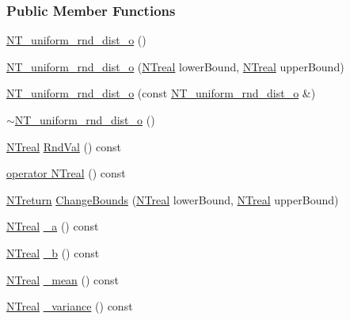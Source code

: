 \subsubsection*{Public Member Functions}
\begin{DoxyCompactItemize}
\item 
\hyperlink{class_n_t__uniform__rnd__dist__o_a8080222882e03991206cc0ab45b33ba9}{NT\_\-uniform\_\-rnd\_\-dist\_\-o} ()
\item 
\hyperlink{class_n_t__uniform__rnd__dist__o_ad5ca2e602baf3039e453cb636f148ee6}{NT\_\-uniform\_\-rnd\_\-dist\_\-o} (\hyperlink{nt__types_8h_a814a97893e9deb1eedcc7604529ba80d}{NTreal} lowerBound, \hyperlink{nt__types_8h_a814a97893e9deb1eedcc7604529ba80d}{NTreal} upperBound)
\item 
\hyperlink{class_n_t__uniform__rnd__dist__o_adeeb9c7fd267d75e3c13622bce35016d}{NT\_\-uniform\_\-rnd\_\-dist\_\-o} (const \hyperlink{class_n_t__uniform__rnd__dist__o}{NT\_\-uniform\_\-rnd\_\-dist\_\-o} \&)
\item 
\hyperlink{class_n_t__uniform__rnd__dist__o_a4e7396853d4a1ac8e03af02e2fbdef16}{$\sim$NT\_\-uniform\_\-rnd\_\-dist\_\-o} ()
\item 
\hyperlink{nt__types_8h_a814a97893e9deb1eedcc7604529ba80d}{NTreal} \hyperlink{class_n_t__uniform__rnd__dist__o_a37e4f70755b300a469a5af332ecd31ef}{RndVal} () const 
\item 
\hyperlink{class_n_t__uniform__rnd__dist__o_a08bf02422a5e48d01b002e4a753a6ccf}{operator NTreal} () const 
\item 
\hyperlink{nt__types_8h_ab9564ee8f091e809d21b8451c6683c53}{NTreturn} \hyperlink{class_n_t__uniform__rnd__dist__o_af12edfc771e062c2af641fa8c99d85bc}{ChangeBounds} (\hyperlink{nt__types_8h_a814a97893e9deb1eedcc7604529ba80d}{NTreal} lowerBound, \hyperlink{nt__types_8h_a814a97893e9deb1eedcc7604529ba80d}{NTreal} upperBound)
\item 
\hyperlink{nt__types_8h_a814a97893e9deb1eedcc7604529ba80d}{NTreal} \hyperlink{class_n_t__uniform__rnd__dist__o_a255e49ba55d593269a4ceefdd4a326cc}{\_\-a} () const 
\item 
\hyperlink{nt__types_8h_a814a97893e9deb1eedcc7604529ba80d}{NTreal} \hyperlink{class_n_t__uniform__rnd__dist__o_aa175c7a6c7578052ea926a9a9b8864b0}{\_\-b} () const 
\item 
\hyperlink{nt__types_8h_a814a97893e9deb1eedcc7604529ba80d}{NTreal} \hyperlink{class_n_t__uniform__rnd__dist__o_a7a6784d12e257131b14456a221007ff7}{\_\-mean} () const 
\item 
\hyperlink{nt__types_8h_a814a97893e9deb1eedcc7604529ba80d}{NTreal} \hyperlink{class_n_t__uniform__rnd__dist__o_ac757c6b47d1f36efadb3ce771ac0d0d8}{\_\-variance} () const 
\end{DoxyCompactItemize}
